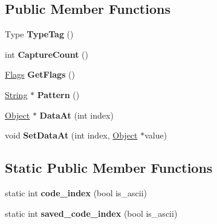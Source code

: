 \subsection*{Public Member Functions}
\begin{DoxyCompactItemize}
\item 
\hypertarget{classv8_1_1internal_1_1_j_s_reg_exp_a68d63f1a8f39171df837237edb4ede42}{}Type {\bfseries Type\+Tag} ()\label{classv8_1_1internal_1_1_j_s_reg_exp_a68d63f1a8f39171df837237edb4ede42}

\item 
\hypertarget{classv8_1_1internal_1_1_j_s_reg_exp_aa8c0fa84718f6a594ab4ae495ddd2229}{}int {\bfseries Capture\+Count} ()\label{classv8_1_1internal_1_1_j_s_reg_exp_aa8c0fa84718f6a594ab4ae495ddd2229}

\item 
\hypertarget{classv8_1_1internal_1_1_j_s_reg_exp_a6f300f132299c887336cd9ee91aeaba3}{}\hyperlink{classv8_1_1internal_1_1_j_s_reg_exp_1_1_flags}{Flags} {\bfseries Get\+Flags} ()\label{classv8_1_1internal_1_1_j_s_reg_exp_a6f300f132299c887336cd9ee91aeaba3}

\item 
\hypertarget{classv8_1_1internal_1_1_j_s_reg_exp_a98ae03f77869ab586e9f649e55d34e85}{}\hyperlink{classv8_1_1internal_1_1_string}{String} $\ast$ {\bfseries Pattern} ()\label{classv8_1_1internal_1_1_j_s_reg_exp_a98ae03f77869ab586e9f649e55d34e85}

\item 
\hypertarget{classv8_1_1internal_1_1_j_s_reg_exp_a32772f058cef001697b855534cd3a4d5}{}\hyperlink{classv8_1_1internal_1_1_object}{Object} $\ast$ {\bfseries Data\+At} (int index)\label{classv8_1_1internal_1_1_j_s_reg_exp_a32772f058cef001697b855534cd3a4d5}

\item 
\hypertarget{classv8_1_1internal_1_1_j_s_reg_exp_a1dd66d58f3fc12d944f63202258a8d8e}{}void {\bfseries Set\+Data\+At} (int index, \hyperlink{classv8_1_1internal_1_1_object}{Object} $\ast$value)\label{classv8_1_1internal_1_1_j_s_reg_exp_a1dd66d58f3fc12d944f63202258a8d8e}

\end{DoxyCompactItemize}
\subsection*{Static Public Member Functions}
\begin{DoxyCompactItemize}
\item 
\hypertarget{classv8_1_1internal_1_1_j_s_reg_exp_ab48b840200558d01466772e7e916f2d5}{}static int {\bfseries code\+\_\+index} (bool is\+\_\+ascii)\label{classv8_1_1internal_1_1_j_s_reg_exp_ab48b840200558d01466772e7e916f2d5}

\item 
\hypertarget{classv8_1_1internal_1_1_j_s_reg_exp_a2f6316a4a2c70d4ffff3cfa5b3ac8a93}{}static int {\bfseries saved\+\_\+code\+\_\+index} (bool is\+\_\+ascii)\label{classv8_1_1internal_1_1_j_s_reg_exp_a2f6316a4a2c70d4ffff3cfa5b3ac8a93}

\end{DoxyCompactItemize}

